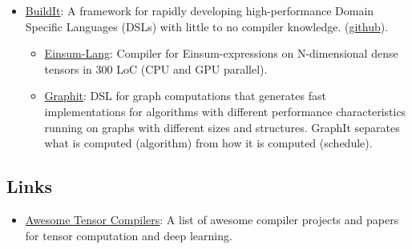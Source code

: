 \begin{itemize}
    \item \href{https://buildit.so/}{BuildIt}: A framework for rapidly developing high-performance Domain Specific Languages (DSLs) with little to no compiler knowledge. (\href{https://github.com/BuildIt-lang/buildit}{github}).
    \begin{itemize}
        \item \href{https://buildit.so/tryit/?sample=einsum}{Einsum-Lang}: Compiler for Einsum-expressions on N-dimensional dense tensors in 300 LoC (CPU and GPU parallel).
        \item \href{https://graphit-lang.org/}{Graphit}: DSL for graph computations that generates fast implementations for algorithms with different performance characteristics running on graphs with different sizes and structures. GraphIt separates what is computed (algorithm) from how it is computed (schedule).
    \end{itemize}
    
\end{itemize}

\subsection{Links}
\begin{itemize}
    \item \href{https://github.com/merrymercy/awesome-tensor-compilers}{Awesome Tensor Compilers}: A list of awesome compiler projects and papers for tensor computation and deep learning.
\end{itemize}

